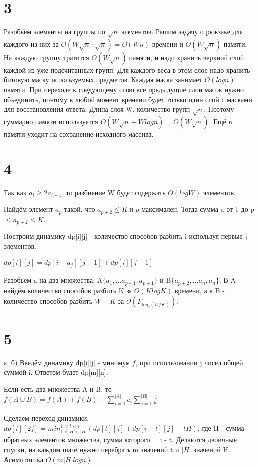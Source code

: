 \documentclass{extarticle}
\begin{document}
\section*{3}

Разобьём элементы на группы по $\sqrt{n}$ элементов. Решим задачу о рюкзаке для каждого из них за $O(W\sqrt{n} \cdot \sqrt{n}) = O(Wn)$ времени и $O(W\sqrt{n})$ памяти. На каждую группу тратится $O(W\sqrt{n})$ памяти, и надо хранить верхний слой каждой из уже подсчитанных групп. Для каждого веса в этом слое надо хранить битовую маску используемых предметов. Каждая маска занимает $O(log n)$ памяти. При переходе к следующему слою все предыдущие слои масок нужно объединить, поэтому в любой момент времени будет только один слой с масками для восстановления ответа. Длина слоя W, количество групп $\sqrt{n}$. Поэтому суммарно памяти используется $O(W\sqrt{n} + W log n) = O(W\sqrt{n})$. Ещё n памяти уходит на сохранение исходного массива.

\section*{4}
Так как $a_i \geq 2a_{i-1}$, то разбиение W будет содержать $O(log W)$ элементов.

Найдём элемент $a_p$ такой, что $a_{p+2} \leq K$ и $p$ максимален. Тогда сумма a от 1 до p $\leq a_{p+2} \leq K$.

Построим динамику dp[i][j] - количество способов разбить i используя первые j элементов.

$dp[i][j] = dp[i - a_j][j - 1] + dp[i][j - 1]$

Разобьём a на два множества: A$\{a_1, \dots a_{p+1}, a_{p+1}\}$ и B$\{a_{p+2}, \dots a_n, a_n\}$. В A найдём количество способов разбить K за $O(K log K)$ времени, а в B - количество способов разбить $W - K$ за $O(F_{log_2 (W/K)})$.

\section*{5}
а, б) Введём динамику dp[i][j] - минимум $f$, при использовании j чисел общей суммой i. Ответом будет dp[m][n].

Если есть два множества A и B, то $f(A \cup B) = f(A) + f(B) + \sum_{i=1}^{|A|} a_i \sum_{j=1}^{|B|} \frac{1}{b_j}$

Сделаем переход динамики: $dp[i][2j] = min_{1<H<|B|}^{1<t<i}(dp[t][j] + dp[i-t][j] + tH)$, где H - сумма обратных элементов множества, сумма которого = i - t. Делаются двоичные спуски, на каждом шаге нужно перебрать m значений t и $|H|$ значений H. Асимптотика $O(m|H| log n)$.
\end{document}

